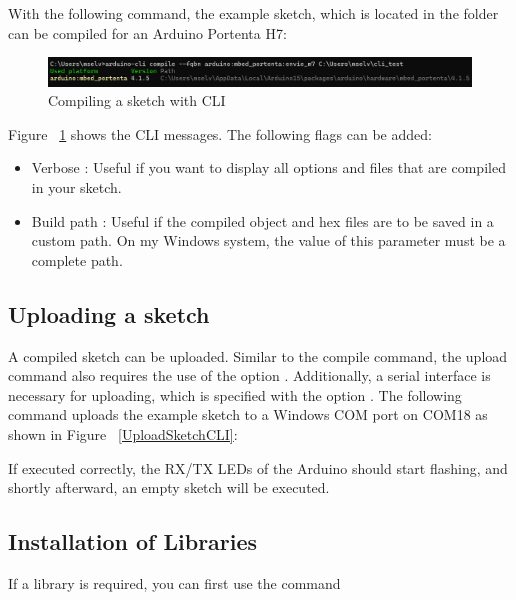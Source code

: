 With the following command, the example sketch, which is located in the folder  can be compiled for an Arduino Portenta H7: 
\newline
\begin{figure}
	\begin{center}
		\includegraphics[width=0.7\linewidth]{Images/ArduinoCLI/CompileSketch.png}
		\caption{Compiling a sketch with CLI }
		\label{CompileSketchCommand}
	\end{center}
\end{figure}
Figure ~\ref{CompileSketchCommand} shows the CLI messages. The following flags can be added:
\begin{itemize}
	\item Verbose : Useful if you want to display all options and files that are compiled in your sketch.
	\item Build path : Useful if the compiled object and hex files are to be saved in a custom path. On my Windows system, the value of this parameter must be a complete path.
\end{itemize}

\subsection{Uploading a sketch}
A compiled sketch can be uploaded. Similar to the compile command, the upload command also requires the use of the option . Additionally, a serial interface is necessary for uploading, which is specified with the option . The following command uploads the example sketch to a Windows COM port on COM18 as shown in Figure ~\ref{UploadSketchCLI}:



If executed correctly, the RX/TX LEDs of the Arduino should start flashing, and shortly afterward, an empty sketch will be executed.

\subsection{Installation of Libraries}
If a library is required, you can first use the command

